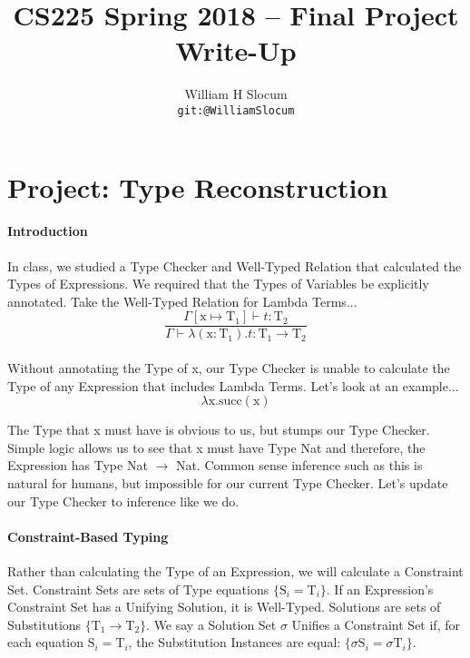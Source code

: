\documentclass{article}
\title{CS225 Spring 2018 -- Final Project Write-Up}
\author{
  William H Slocum \\ \small{\texttt{git:@WilliamSlocum}}
}
\begin{document}
\maketitle

\section*{Project: Type Reconstruction}

\paragraph{Introduction}
In class, we studied a Type Checker and Well-Typed Relation that calculated the Types of Expressions. We required that the Types of Variables be explicitly annotated. Take the Well-Typed Relation for Lambda Terms...
\\
\begin{equation*}
    \frac{\Gamma[\text{x} \mapsto \text{T}_{1}] \vdash t : \text{T}_{2}}
    {\Gamma \vdash \lambda(\text{x} : \text{T}_{1}).t : \text{T}_{1} \to \text{T}_{2}}
\end{equation*}
\\
Without annotating the Type of x, our Type Checker is unable to calculate the Type of any Expression that includes Lambda Terms. Let's look at an example...
\begin{equation*}
    \lambda\text{x}.\text{succ}(\text{x})
\end{equation*}

The Type that x must have is obvious to us, but stumps our Type Checker. Simple logic allows us to see that x must have Type Nat and therefore, the Expression has Type Nat $\to$ Nat. Common sense inference such as this is natural for humans, but impossible for our current Type Checker. Let's update our Type Checker to inference like we do.

\paragraph{Constraint-Based Typing}
Rather than calculating the Type of an Expression, we will calculate a Constraint Set. Constraint Sets are sets of Type equations $\{\text{S}_{i} = \text{T}_{i}\}$. If an Expression's Constraint Set has a Unifying Solution, it is Well-Typed. Solutions are sets of Substitutions $\{\text{T}_{1} \to \text{T}_{2}\}$. We say a Solution Set $\sigma$ Unifies a Constraint Set if, for each equation $\text{S}_{i} = \text{T}_{i}$, the Substitution Instances are equal: $\{\sigma\text{S}_{i} = \sigma\text{T}_{i}\}$.\\
\end{document}
